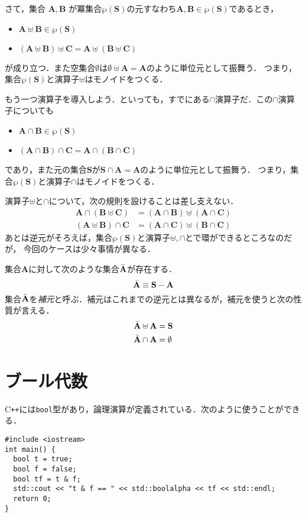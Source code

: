 \documentclass{jsbook}
\newcommand{\cxx}{\textrm{C}\texttt{++}}
\newcommand{\ccode}[1]{\texttt{#1}}
\newcommand{\keyword}[1]{\emph{#1}}
\newcommand{\bg}[1]{\mathbf{#1}}
\begin{document}
さて，集合 $\bg{A},\bg{B}$ が冪集合$\wp(\bg{S})$の元すなわち$\bg{A},\bg{B}\in\wp(\bg{S})$であるとき，
\begin{itemize}
\item $\bg{A}\uplus\bg{B}\in\wp(\bg{S})$
\item $(\bg{A}\uplus\bg{B})\uplus\bg{C}=\bg{A}\uplus(\bg{B}\uplus\bg{C})$
\end{itemize}
が成り立つ．また空集合$\emptyset$は$\emptyset\uplus\bg{A}=\bg{A}$のように単位元として振舞う．
つまり，集合$\wp(\bg{S})$と演算子$\uplus$はモノイドをつくる．

もう一つ演算子を導入しよう．といっても，すでにある$\cap$演算子だ．この$\cap$演算子についても
\begin{itemize}
\item $\bg{A}\cap\bg{B}\in\wp(\bg{S})$
\item $(\bg{A}\cap\bg{B})\cap\bg{C}=\bg{A}\cap(\bg{B}\cap\bg{C})$
\end{itemize}
であり，また元の集合$\bg{S}$が$\bg{S}\cap\bg{A}=\bg{A}$のように単位元として振舞う．
つまり，集合$\wp(\bg{S})$と演算子$\cap$はモノイドをつくる．

演算子$\uplus$と$\cap$について，次の規則を設けることは差し支えない．
\begin{align}
\bg{A}\cap(\bg{B}\uplus\bg{C})&=(\bg{A}\cap\bg{B})\uplus(\bg{A}\cap\bg{C})\\
(\bg{A}\uplus\bg{B})\cap\bg{C}&=(\bg{A}\cap\bg{C})\uplus(\bg{B}\cap\bg{C})
\end{align}
あとは逆元がそろえば，集合$\wp(\bg{S})$と演算子$\uplus,\cap$とで環ができるところなのだが，
今回のケースは少々事情が異なる．

集合$\bg{A}$に対して次のような集合$\Bar{\bg{A}}$が存在する．
\begin{equation}
\Bar{\bg{A}}\equiv\bg{S}-\bg{A}
\end{equation}
集合$\Bar{\bg{A}}$を\keyword{補元}と呼ぶ．補元はこれまでの逆元とは異なるが，補元を使うと次の性質が言える．
\begin{align}
\Bar{\bg{A}}\uplus\bg{A}&=\bg{S}\\
\Bar{\bg{A}}\cap\bg{A}&=\emptyset
\end{align}


\section{ブール代数}

\cxx には\ccode{bool}型があり，論理演算が定義されている．次のように使うことができる．
\begin{verbatim}
#include <iostream>
int main() {
  bool t = true;
  bool f = false;
  bool tf = t & f;
  std::cout << "t & f == " << std::boolalpha << tf << std::endl;
  return 0;
}
\end{verbatim}
\end{document}
